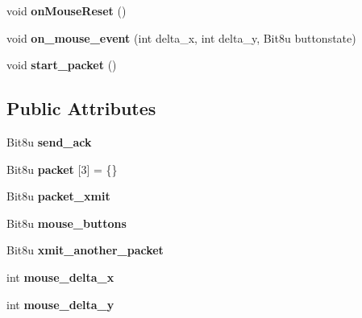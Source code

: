 \begin{DoxyCompactItemize}
\item 
\hypertarget{classCSerialMouse_ac33697aec9a1c937ea148d1a8d17ef66}{void {\bfseries on\-Mouse\-Reset} ()}\label{classCSerialMouse_ac33697aec9a1c937ea148d1a8d17ef66}

\item 
\hypertarget{classCSerialMouse_a602b3efff01fdee515d23b9025a146d6}{void {\bfseries on\-\_\-mouse\-\_\-event} (int delta\-\_\-x, int delta\-\_\-y, Bit8u buttonstate)}\label{classCSerialMouse_a602b3efff01fdee515d23b9025a146d6}

\item 
\hypertarget{classCSerialMouse_ae2878fe6cab53b6f2896a12de75364d6}{void {\bfseries start\-\_\-packet} ()}\label{classCSerialMouse_ae2878fe6cab53b6f2896a12de75364d6}

\end{DoxyCompactItemize}
\subsection*{Public Attributes}
\begin{DoxyCompactItemize}
\item 
\hypertarget{classCSerialMouse_ab0c90ed4c6767060ada8cfbe0246d1b8}{Bit8u {\bfseries send\-\_\-ack}}\label{classCSerialMouse_ab0c90ed4c6767060ada8cfbe0246d1b8}

\item 
\hypertarget{classCSerialMouse_a90daf42329ed126107dace05a34bf737}{Bit8u {\bfseries packet} \mbox{[}3\mbox{]} = \{\}}\label{classCSerialMouse_a90daf42329ed126107dace05a34bf737}

\item 
\hypertarget{classCSerialMouse_aadac1a4bed0949f61fe8b4542fd51794}{Bit8u {\bfseries packet\-\_\-xmit}}\label{classCSerialMouse_aadac1a4bed0949f61fe8b4542fd51794}

\item 
\hypertarget{classCSerialMouse_ae7c021aa53dc026703a7c2d5b0d43721}{Bit8u {\bfseries mouse\-\_\-buttons}}\label{classCSerialMouse_ae7c021aa53dc026703a7c2d5b0d43721}

\item 
\hypertarget{classCSerialMouse_ad30cc88a72d2735c5b3cf9a2f36af733}{Bit8u {\bfseries xmit\-\_\-another\-\_\-packet}}\label{classCSerialMouse_ad30cc88a72d2735c5b3cf9a2f36af733}

\item 
\hypertarget{classCSerialMouse_a14e865d07f45a13a6e7a7875f1c3c72a}{int {\bfseries mouse\-\_\-delta\-\_\-x}}\label{classCSerialMouse_a14e865d07f45a13a6e7a7875f1c3c72a}

\item 
\hypertarget{classCSerialMouse_a2aa1ffe757b4ce1c1915fec3146427ef}{int {\bfseries mouse\-\_\-delta\-\_\-y}}\label{classCSerialMouse_a2aa1ffe757b4ce1c1915fec3146427ef}

\end{DoxyCompactItemize}


